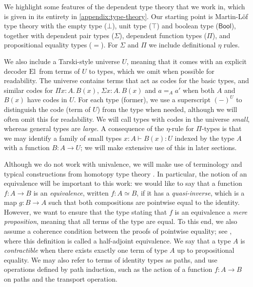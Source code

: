 \documentclass[10pt,a4paper]{article}
\theoremstyle{definition}
\theoremstyle{remark}
\renewcommand{\.}{.\,} %
\renewcommand{\:}{:} %
\newcommand{\El}{\mathrm{El}\,}
\newcommand{\0}{\mathbf{0}}
\newcommand{\1}{\mathbf{1}}
\newcommand\<\langle
\renewcommand\>\rangle
\renewcommand\sf\mathsf
\newcommand{\U}{U}
\theoremstyle{remark}
\begin{document}
\newenvironment{bprooftree}
{\leavevmode\hbox\bgroup}
{\DisplayProof\egroup}

We highlight some features of the dependent type theory that we work in, which is given in its entirety in \autoref{appendix:type-theory}. 
Our starting point is Martin-L\"of type theory with the empty type (\(\bot\)), unit type (\(\top\)) and boolean type (\(\sf{Bool}\)), together with dependent pair types (\(\Sigma\)), dependent function types (\(\Pi\)), and propositional equality types (\(=\)).
For \(\Sigma\) and \(\Pi\) we include definitional \(\eta\) rules.

We also include a Tarski-style universe \(U\), meaning that it comes with an explicit decoder \( \El \) from terms of \(U\) to types, which we omit when possible for readability.
The universe contains terms that act as codes for the basic types, and similar codes for \(\Pi x:A.\,B(x)\), \(\Sigma x:A.\,B(x)\) and \(a=_Aa'\) when both \(A\) and \(B(x)\) have codes in \(U\).
For each type (former), we use a superscript \((-)^U\) to distinguish the code (term of \(U\)) from the type when needed, although we will often omit this for readability.
We will call types with codes in the universe \emph{small}, whereas general types are \emph{large}.
A consequence of the $\eta$-rule for $\Pi$-types is that we may identify a family of small types $x:A\vdash B(x):\U$ indexed by the type $A$ with a function $B:A\to\U$; we will make extensive use of this in later sections.

Although we do not work with univalence, we will make use of terminology and typical constructions from homotopy type theory \cite{hottbook}.
In particular, the notion of an equivalence will be important to this work: we would like to say that a function \(f:A\to B\) is an \emph{equivalence}, written \(f:A\simeq B\), if it has a \emph{quasi-inverse}, which is a map \(g:B\to A\) such that both compositions are pointwise equal to the identity. However, we want to ensure that the type stating that \(f\) is an equivalence a \emph{mere proposition}, meaning that all terms of the type are equal. To this end, we also assume a coherence condition between the proofs of pointwise equality; see \cite[Definition 4.2.1]{hottbook}, where this definition is called a half-adjoint equivalence. We say that a type $A$ is \emph{contractible} when there exists exactly one term of type $A$ up to propositional equality.
We may also refer to terms of identity types as paths, and use operations defined by path induction, such as the action of a function \( f : A \to B \) on paths and the transport operation.
\end{document}
